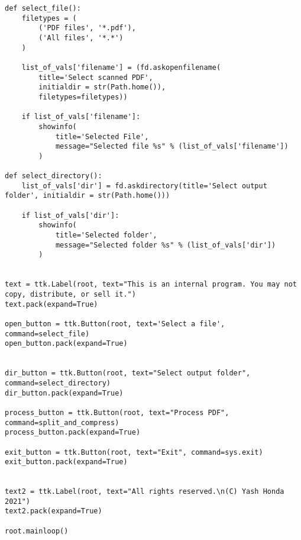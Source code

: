 \documentclass[9pt]{report}
\begin{document}
\begin{verbatim}
def select_file():
    filetypes = (
        ('PDF files', '*.pdf'),
        ('All files', '*.*')
    )

    list_of_vals['filename'] = (fd.askopenfilename(
        title='Select scanned PDF',
        initialdir = str(Path.home()),
        filetypes=filetypes))

    if list_of_vals['filename']:
        showinfo(
            title='Selected File',
            message="Selected file %s" % (list_of_vals['filename'])
        )

def select_directory():
    list_of_vals['dir'] = fd.askdirectory(title='Select output folder', initialdir = str(Path.home()))

    if list_of_vals['dir']:
        showinfo(
            title='Selected folder',
            message="Selected folder %s" % (list_of_vals['dir'])
        )


text = ttk.Label(root, text="This is an internal program. You may not copy, distribute, or sell it.")
text.pack(expand=True)

open_button = ttk.Button(root, text='Select a file', command=select_file)
open_button.pack(expand=True)


dir_button = ttk.Button(root, text="Select output folder", command=select_directory)
dir_button.pack(expand=True)

process_button = ttk.Button(root, text="Process PDF", command=split_and_compress)
process_button.pack(expand=True)

exit_button = ttk.Button(root, text="Exit", command=sys.exit)
exit_button.pack(expand=True)


text2 = ttk.Label(root, text="All rights reserved.\n(C) Yash Honda 2021")
text2.pack(expand=True)

root.mainloop()
\end{verbatim}
\end{document}
